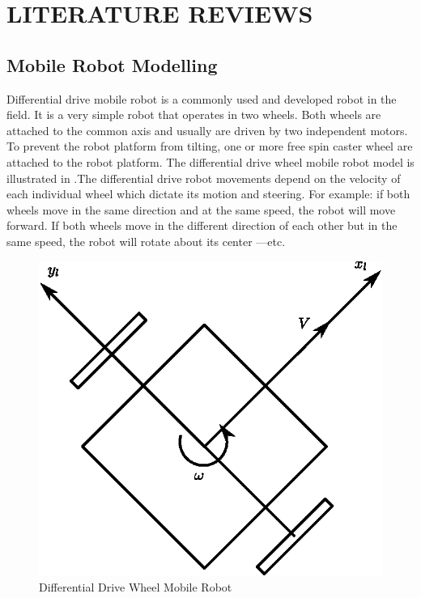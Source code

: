 \section{LITERATURE REVIEWS}
\subsection{Mobile Robot Modelling}
\hspace{1.27cm}
Differential drive mobile robot is a commonly used and developed robot in the field. It is a very simple robot that operates in two wheels. Both wheels are attached to the common axis and usually are driven by two independent motors. To prevent the robot platform from tilting, one or more free spin caster wheel are attached to the robot platform. The differential drive wheel mobile robot model is illustrated in \textbf{\figureautorefname{ \ref{fig:Differential Drive Wheel Mobile Robot}}}.The differential drive robot movements depend on the velocity of each individual wheel which dictate its motion and steering. For example: if both wheels move in the same direction and at the same speed, the robot will move forward. If both wheels move in the different direction of each other but in the same speed, the robot will rotate about its center —etc.\par

\begin{figure}[ht]
	\centering
	\includegraphics[scale=1]{images/imagess/2lit-DDWMR.eps} 
	\caption{Differential Drive Wheel Mobile Robot}
	\label{fig:Differential Drive Wheel Mobile Robot}
\end{figure}

